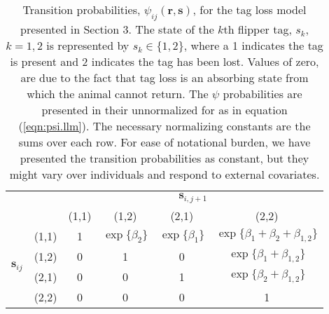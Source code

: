 \documentclass[sts]{imsart}
\numberwithin{equation}{section}
\theoremstyle{plain}
\newcommand{\bs}{\ensuremath{\mathbf{s}}}
\newcommand{\br}{\ensuremath{\mathbf{r}}}
\begin{document}
\begin{table}[ht]
\centering
\parbox{\textwidth}{\caption{\label{tb:psi.example}  Transition probabilities, $\psi_{ij}(\br,\bs)$, for the tag loss model presented in Section 3. The state of the $k$th flipper tag, $s_k$, $k=1,2$ is represented by $s_k \in \{1,2\}$, where a 1 indicates the tag is present and 2 indicates the tag has been lost. Values of zero, are due to the fact that tag loss is an absorbing state from which the animal cannot return. The $\psi$ probabilities are presented in their unnormalized for as in equation (\ref{eqn:psi.llm}). The necessary normalizing constants are the sums over each row. For ease of notational burden, we have presented the transition probabilities as constant, but they might vary over individuals and respond to external covariates.}} \medskip

\begin{tabular}{cc|cccc|}
\cline{3-6}
 &  & \multicolumn{4}{c|}{$\bs_{i,j+1}$} \\
 &  & (1,1) & (1,2) & (2,1) & (2,2) \\ \hline
\multicolumn{1}{|c}{\multirow{4}{*}{$\bs_{ij}$}} & (1,1) & 1 & $\exp\{\beta_2\}$ & $\exp\{\beta_1\}$ & $\exp\{\beta_1+\beta_2+\beta_{1,2}\}$ \\
\multicolumn{1}{|c}{} & (1,2) & 0 & 1 & 0 & $\exp\{\beta_1+\beta_{1,2}\}$ \\
\multicolumn{1}{|c}{} & (2,1) & 0 & 0 & 1 & $\exp\{\beta_2+\beta_{1,2}\}$ \\
\multicolumn{1}{|c}{} & (2,2) & 0 & 0 & 0 & 1 \\ \hline
\end{tabular}
\end{table}


\clearpage
\end{document}
